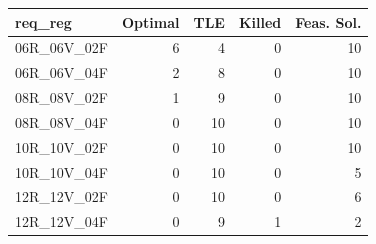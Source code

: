 
\begin{tabular}{lrrrr}
\toprule
req\_reg & Optimal & TLE & Killed & Feas. Sol.\\
\midrule
06R\_06V\_02F & 6 & 4 & 0 & 10\\
06R\_06V\_04F & 2 & 8 & 0 & 10\\
08R\_08V\_02F & 1 & 9 & 0 & 10\\
08R\_08V\_04F & 0 & 10 & 0 & 10\\
10R\_10V\_02F & 0 & 10 & 0 & 10\\
\addlinespace
10R\_10V\_04F & 0 & 10 & 0 & 5\\
12R\_12V\_02F & 0 & 10 & 0 & 6\\
12R\_12V\_04F & 0 & 9 & 1 & 2\\
\bottomrule
\end{tabular}
